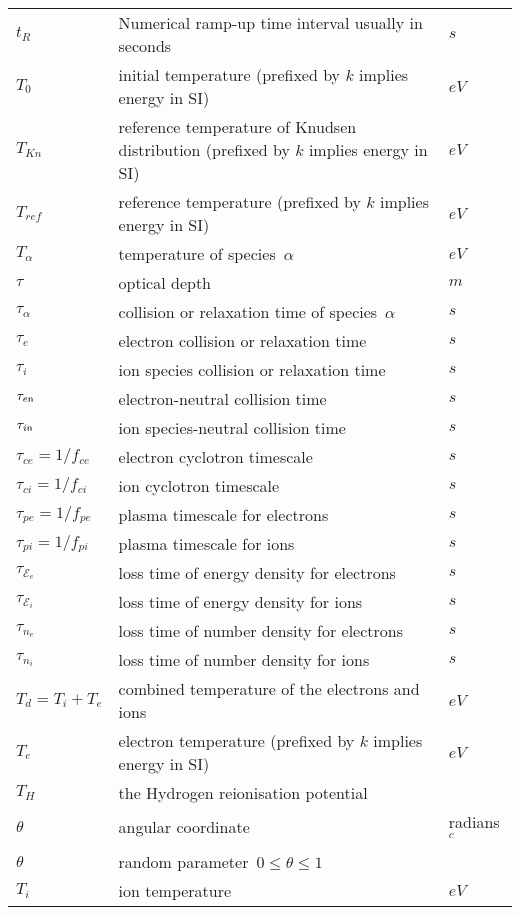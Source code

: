 \begin{longtable}{|p{3.0cm}|p{10.0cm}|p{3.0cm}|}
$t_R$ & Numerical ramp-up time interval usually in seconds  & $s$ \\
$T_0$ & initial temperature (prefixed by $k$ implies energy in SI)  & $eV$ \\
$T_{Kn}$ & reference temperature of Knudsen distribution (prefixed by $k$ implies energy in SI)  & $eV$ \\
$T_{ref}$ & reference temperature (prefixed by $k$ implies energy in SI)  & $eV$ \\
$T_\alpha$ & temperature of species~$\alpha$  & $eV$ \\
$\tau$ & optical depth  & $m$ \\
$\tau_\alpha$ & collision or relaxation time of species~$\alpha$   & $s$ \\
$\tau_e$ & electron collision or relaxation time   & $s$ \\
$\tau_i$ & ion species collision or relaxation time   & $s$ \\
$\tau_{e{\sf n}} $ & electron-neutral collision time   & $s$ \\
$\tau_{i{\sf n}} $ & ion species-neutral collision time   & $s$ \\
$\tau_{ce}=1/f_{ce}$ & electron cyclotron timescale & $s$ \\
$\tau_{ci}=1/f_{ci}$ & ion cyclotron timescale & $s$ \\
$\tau_{pe}=1/f_{pe}$ & plasma timescale for electrons & $s$ \\
$\tau_{pi}=1/f_{pi}$ & plasma timescale for ions & $s$ \\
$\tau_{\mathcal{E}_e}$ & loss time of energy density for electrons   & $s$ \\
$\tau_{\mathcal{E}_i}$ & loss time of energy density for ions   & $s$ \\
$\tau_{n_e}$ & loss time of number density for electrons   & $s$ \\
$\tau_{n_i}$ & loss time of number density for ions   & $s$ \\
$T_d=T_i+T_e$ & combined temperature of the electrons and ions  & $eV$ \\
$T_e$ & electron temperature (prefixed by $k$ implies energy in SI)  & $eV$ \\
$T_H$ & the Hydrogen reionisation potential  & \\
$\theta$ & angular coordinate & radians $^c$ \\
$\theta$ & random parameter~$0\leq\theta\leq 1$ & \\
$T_i$ & ion temperature  & $eV$ \\

\end{longtable}
